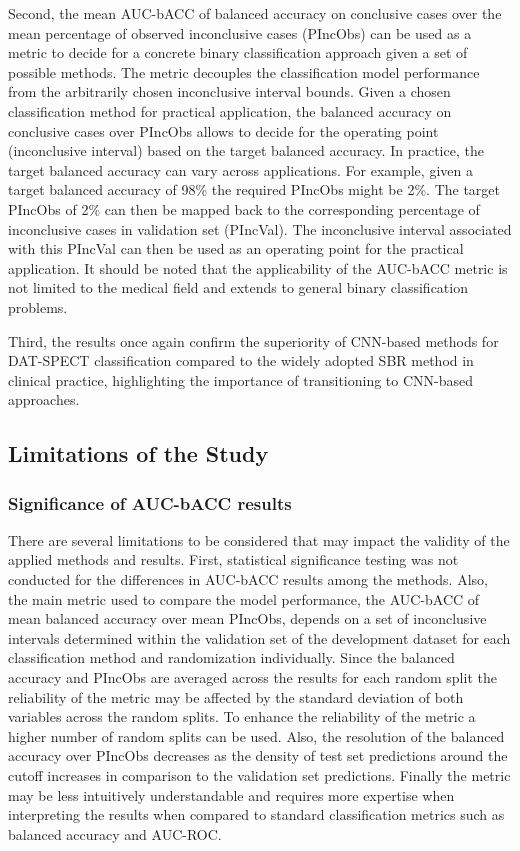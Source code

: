 Second, the mean AUC-bACC of balanced accuracy on conclusive cases over the mean percentage of observed inconclusive cases (PIncObs)
can be used as a metric to decide for a concrete binary classification approach given a set of possible methods.
The metric decouples the classification model performance from the arbitrarily chosen inconclusive interval bounds.
Given a chosen classification method for practical application,
the balanced accuracy on conclusive cases over PIncObs allows to decide for the operating point (inconclusive interval)
based on the target balanced accuracy.
In practice, the target balanced accuracy can vary across applications.
For example, given a target balanced accuracy of 98\% the required PIncObs might be 2\%. 
The target PIncObs of 2\% can then be mapped back to the corresponding percentage of inconclusive cases in 
validation set (PIncVal).
The inconclusive interval associated with this PIncVal can then be used 
as an operating point for the practical application.
It should be noted that the applicability of the AUC-bACC metric is not limited to the medical field
and extends to general binary classification problems.

Third, the results once again confirm the superiority of CNN-based methods for DAT-SPECT classification compared to the
widely adopted SBR method in clinical practice, highlighting the importance of transitioning to CNN-based approaches.

\subsection{Limitations of the Study}

\subsubsection{Significance of AUC-bACC results}

There are several limitations to be considered that may impact the validity of the applied methods and results.
First, statistical significance testing was not conducted for the differences in AUC-bACC results among the methods.
Also, the main metric used to compare the model performance, the AUC-bACC of mean balanced accuracy over mean PIncObs, 
depends on a set of inconclusive intervals determined within the validation set of the development dataset 
for each classification method and randomization individually.
Since the balanced accuracy and PIncObs are averaged across the results for each random split 
the reliability of the metric may be affected by the standard deviation of both variables across the random splits.
To enhance the reliability of the metric a higher number of random splits can be used.
Also, the resolution of the balanced accuracy over PIncObs decreases as the density of test set 
predictions around the cutoff increases in comparison to the validation set predictions.
Finally the metric may be less intuitively understandable and requires more expertise when interpreting the results
when compared to standard classification metrics such as balanced accuracy and AUC-ROC.


